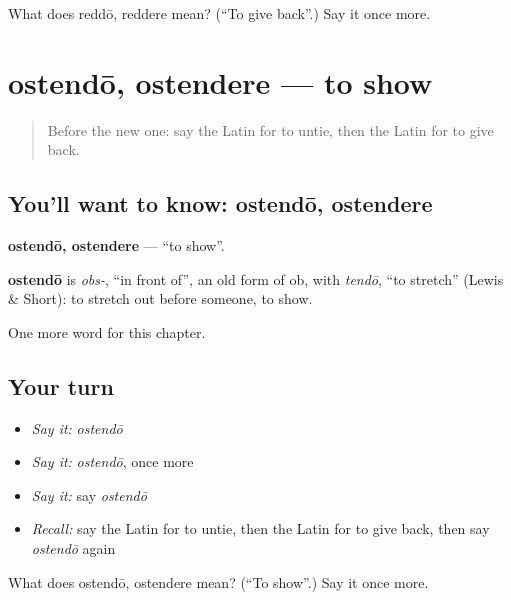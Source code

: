 \begin{tcolorbox}[breakable,colback=teal!4,colframe=teal!35!black,title={Before you move on}]
What does reddō, reddere mean? (\textquotedblleft{}To give back\textquotedblright{}.) Say it once more.
\end{tcolorbox}
\section[ostendō, ostendere]{ostendō, ostendere — to show}

\label{lesson:LA-C157-ostendo}



\begin{quote}
Before the new one: say the Latin for to untie, then the Latin for to give back.
\end{quote}

\subsection*{You'll want to know: ostendō, ostendere}
\textbf{ostendō, ostendere} — \textquotedblleft{}to show\textquotedblright{}.

\begin{cousinweb}
\textbf{ostendō} is \emph{obs-}, \textquotedblleft{}in front of\textquotedblright{}, an old form of ob, with \emph{tendō}, \textquotedblleft{}to stretch\textquotedblright{} (Lewis \& Short): to stretch out before someone, to show.
\end{cousinweb}

\begin{grammarlens}[title={What you've built}]
One more word for this chapter.
\end{grammarlens}

\subsection*{Your turn}
\begin{itemize}
\raggedright
  \item \emph{Say it:} \emph{ostendō}
  \item \emph{Say it:} \emph{ostendō}, once more
  \item \emph{Say it:} say \emph{ostendō}
  \item \emph{Recall:} say the Latin for to untie, then the Latin for to give back, then say \emph{ostendō} again
\end{itemize}

\begin{tcolorbox}[breakable,colback=teal!4,colframe=teal!35!black,title={Before you move on}]
What does ostendō, ostendere mean? (\textquotedblleft{}To show\textquotedblright{}.) Say it once more.
\end{tcolorbox}
